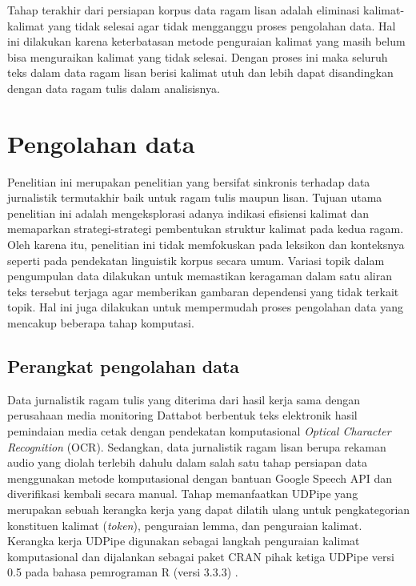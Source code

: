 Tahap terakhir dari persiapan korpus data ragam lisan adalah eliminasi kalimat-kalimat yang tidak selesai agar tidak mengganggu proses pengolahan data. Hal ini dilakukan karena keterbatasan metode penguraian kalimat yang masih belum bisa menguraikan kalimat yang tidak selesai. Dengan proses ini maka seluruh teks dalam data ragam lisan berisi kalimat utuh dan lebih dapat disandingkan dengan data ragam tulis dalam analisisnya.

\section{Pengolahan data}

Penelitian ini merupakan penelitian yang bersifat sinkronis terhadap data jurnalistik termutakhir baik untuk ragam tulis maupun lisan. Tujuan utama penelitian ini adalah mengeksplorasi adanya indikasi efisiensi kalimat dan memaparkan strategi-strategi pembentukan struktur kalimat pada kedua ragam. Oleh karena itu, penelitian ini tidak memfokuskan pada leksikon dan konteksnya seperti pada pendekatan linguistik korpus secara umum. Variasi topik dalam pengumpulan data dilakukan untuk memastikan keragaman dalam satu aliran teks tersebut terjaga agar memberikan gambaran dependensi yang tidak terkait topik. Hal ini juga dilakukan untuk mempermudah proses pengolahan data yang mencakup beberapa tahap komputasi.

\subsection{Perangkat pengolahan data}
Data jurnalistik ragam tulis yang diterima dari hasil kerja sama dengan perusahaan media monitoring Dattabot berbentuk teks elektronik hasil pemindaian media cetak dengan pendekatan komputasional \textit{Optical Character Recognition} (OCR). Sedangkan, data jurnalistik ragam lisan berupa rekaman audio yang diolah terlebih dahulu dalam salah satu tahap persiapan data menggunakan metode komputasional dengan bantuan Google Speech API dan diverifikasi kembali secara manual. Tahap 
 memanfaatkan UDPipe \citep{udpipe2017} yang merupakan sebuah kerangka kerja yang dapat dilatih ulang untuk pengkategorian konstituen kalimat (\textit{token}), penguraian lemma, dan penguraian kalimat. Kerangka kerja UDPipe digunakan sebagai langkah penguraian kalimat komputasional dan dijalankan sebagai paket CRAN pihak ketiga UDPipe versi 0.5 \cite{udpipe2017manual} pada bahasa pemrograman R (versi 3.3.3) \citep{r2017project}. 

